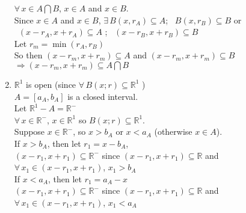 \documentclass[twoside]{amsart}
\theoremstyle{plain}
\theoremstyle{definition}
\begin{document}
\begin{enumerate}
$\forall \, x \in A \bigcap B$, $x \in A$ and $x \in B$.  \\
\quad Since $x \in A$ and $x \in B$, $\exists \, B(x,r_A) \subseteq A$; \, $B(x,r_B) \subseteq B$ or \\
\quad \quad \quad \, $(x-r_A,x+r_A) \subseteq A$ ; \quad \, $(x-r_B, x+r_B) \subseteq B$ \smallskip \\
Let $r_m = \min{ (r_A,r_B) }$ \\
So then $(x-r_m,x+r_m) \subseteq A$ and $(x-r_m,x+r_m) \subseteq B$ $\Longrightarrow (x-r_m,x+r_m) \subseteq A \bigcap B$
\item $\mathbb{R}^1$ is open (since $\forall \, B(x;r) \subseteq \mathbb{R}^1$ ) \\
  $A = [a_A,b_A]$ is a closed interval.  \\
  Let $\mathbb{R}^1 - A = \mathbb{R}^-$ \\
  $\forall \, x \in \mathbb{R}^-$, $x \in \mathbb{R}^1$ so $B(x;r) \subseteq \mathbb{R}^1$.  \medskip \\
  Suppose $x \in \mathbb{R}^-$, so $x > b_A$ or $x < a_A$ (otherwise $x \in A$).  \medskip \\
  \quad \quad If $x > b_A$, then let $r_1 = x - b_A$, \\
  $(x-r_1,x+r_1) \subseteq \mathbb{R}^-$ since $(x-r_1,x+r_1) \subseteq \mathbb{R}$ and $\forall \, x_1 \in (x-r_1, x+r_1)$, $x_1 > b_A$ \\
  \quad \quad If $x < a_A$, then let $r_1 = a_A - x$ \\
  $(x-r_1,x+r_1) \subseteq \mathbb{R}^-$ since $(x-r_1,x+r_1) \subseteq \mathbb{R}$ and $\forall \, x_1 \in (x-r_1, x+r_1)$, $x_1 < a_A$
\end{enumerate} 
\end{document}

